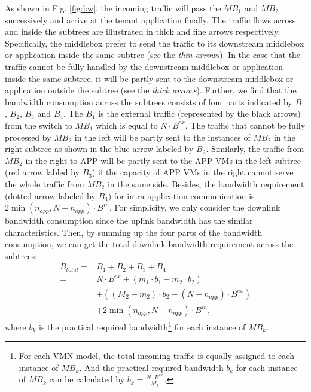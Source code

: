 \documentclass[review]{elsarticle}
\begin{document}
As shown in Fig. \ref{fig:bw}, the incoming traffic will pass the $MB_1$ and $MB_2$ successively and  arrive at the tenant application finally. The traffic flows across and inside the subtrees are illustrated in thick and fine arrows respectively. Specifically,
the middlebox prefer to send the traffic to its downstream middlebox or application inside the same subtree (see the \emph{thin arrows}). 
In the case that the traffic cannot be fully handled by the downstream middlebox or application inside the same subtree, it will be partly sent to the downstream middlebox or application outside the subtree (see the \emph{thick arrows}). 
Further, we find that the bandwidth consumption across the subtrees consists of four parts indicated by $B_1$, $B_2$, $B_3$ and $B_4$. The $B_1$ is the external traffic (represented by the black arrows) from the switch to $MB_1$ which is equal to $N\cdot B^{ex}$. The traffic that cannot be fully processed by $MB_2$ in the left will be partly sent to the instances of $MB_2$ in the right subtree as shown in the blue arrow labeled by $B_2$. Similarly, the traffic from $MB_2$ in the right to APP will be partly sent to the APP VMs in the left subtree (red arrow labled by $B_3$) if the capacity of APP VMs in the right cannot serve the whole traffic from $MB_2$ in the same side. Besides, the bandwidth requirement (dotted arrow labeled by $B_4$) for intra-application communication is $2\min(n_{app}  ,N-n_{app})\cdot B^{in}$. For simplicity, we only consider the downlink bandwidth consumption since the uplink bandwidth has the similar characteristics. %
Then, by summing up the four parts of the bandwidth consumption, we can get the total downlink bandwidth requirement across the subtrees:
\begin{equation}
\begin{aligned}
B_{total} = &B_1+B_2+B_3+B_4 \\
=&N \cdot B^{ex}+(m_1 \cdot b_1-m_2\cdot b_2)\\
&+((M_2-m_2)\cdot b_2-(N-n_{app})\cdot B^{ex})\\
&+2\min(n_{app}, N-n_{app})\cdot B^{in},
\end{aligned}
\end{equation}
where $b_k$ is the practical required bandwidth\footnote{For each VMN model, %
	the total incoming traffic is equally assigned to each instance of $MB_k$. And the practical required bandwidth $b_k$ for each instance of $MB_k$ can be calculated by 
	$b_{k}=\frac{N\cdot B^{ex}}{M_{k}}$.
	}  for each instance of $MB_k$.
	
\end{document}
